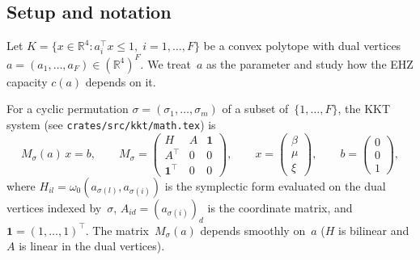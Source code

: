 %
%
%
%



\subsection*{Setup and notation}

Let $K = \{x \in \mathbb{R}^4 : a_i^\top x \leq 1,\; i = 1, \ldots, F\}$
be a convex polytope with dual vertices
$a = (a_1, \ldots, a_F) \in (\mathbb{R}^4)^F$.
We treat~$a$ as the parameter and study how the EHZ capacity
$c(a)$ depends on it.

For a cyclic permutation $\sigma = (\sigma_1, \ldots, \sigma_m)$
of a subset of~$\{1, \ldots, F\}$,
the KKT system (see \texttt{crates/src/kkt/math.tex}) is
\begin{equation}\label{eq:kkt-system}
  M_\sigma(a)\, x = b,
  \qquad
  M_\sigma = \begin{pmatrix}
    H & A & \mathbf{1} \\
    A^\top & 0 & 0 \\
    \mathbf{1}^\top & 0 & 0
  \end{pmatrix},
  \qquad
  x = \begin{pmatrix} \beta \\ \mu \\ \xi \end{pmatrix},
  \qquad
  b = \begin{pmatrix} 0 \\ 0 \\ 1 \end{pmatrix},
\end{equation}
where $H_{il} = \omega_0(a_{\sigma(l)}, a_{\sigma(i)})$ is the
symplectic form evaluated on the dual vertices indexed by~$\sigma$,
$A_{id} = (a_{\sigma(i)})_d$ is the coordinate matrix,
and $\mathbf{1} = (1, \ldots, 1)^\top$.
The matrix~$M_\sigma(a)$ depends smoothly on~$a$
($H$ is bilinear and $A$ is linear in the dual vertices).

